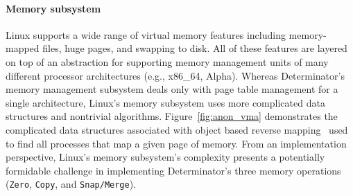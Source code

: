 \begin{itemize}
\paragraph{Memory subsystem} Linux supports a wide range of virtual memory
features including memory-mapped files, huge pages, and swapping to disk. All
of these features are layered on top of an abstraction for supporting memory
management units of many different processor architectures (e.g., x86\_64,
Alpha). Whereas Determinator's memory management subsystem deals
only with page table management for a single architecture, Linux's memory
subsystem uses more complicated data structures and nontrivial algorithms.
Figure~\ref{fig:anon_vma} demonstrates the complicated data structures associated
with object based reverse mapping~\cite{overlyanon} used to find all processes
that map a given page of memory. From an implementation perspective, Linux's
memory subsystem's complexity presents a potentially formidable challenge in
implementing Determinator's three memory operations ({\tt Zero}, {\tt Copy}, and
{\tt Snap/Merge}).


\end{itemize}
